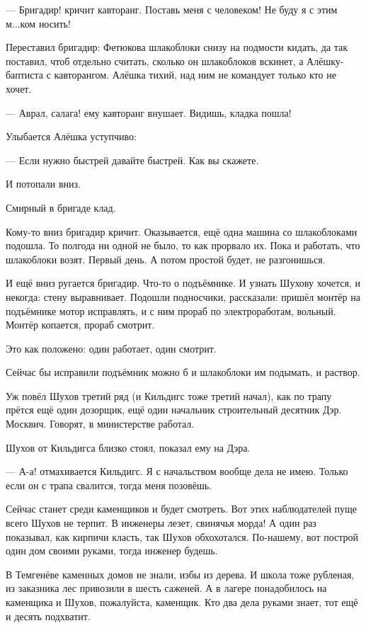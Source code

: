 --- Бригадир! \dash кричит кавторанг. \Dash Поставь меня с человеком! Не буду я с этим м...ком носить!

Переставил бригадир: Фетюкова шлакоблоки снизу на подмости кидать, да так поставил, чтоб
отдельно считать, сколько он шлакоблоков вскинет, а Алёшку-баптиста \dash с кавторангом. Алёшка
\dash тихий, над ним не командует только кто не хочет.

--- Аврал, салага! \dash ему кавторанг внушает. \Dash Видишь, кладка пошла!

Улыбается Алёшка уступчиво:

--- Если нужно быстрей \dash давайте быстрей. Как вы скажете.

И потопали вниз.

Смирный \dash в бригаде клад.

Кому-то вниз бригадир кричит. Оказывается, ещё одна машина со шлакоблоками подошла. То
полгода ни одной не было, то как прорвало их. Пока и работать, что шлакоблоки возят. Первый
день. А потом простой будет, не разгонишься.

И ещё вниз ругается бригадир. Что-то о подъёмнике. И узнать Шухову хочется, и некогда: стену
выравнивает. Подошли подносчики, рассказали: пришёл монтёр на подъёмнике мотор исправлять,
и с ним прораб по электроработам, вольный. Монтёр копается, прораб смотрит.

Это \dash как положено: один работает, один смотрит.

Сейчас бы исправили подъёмник \dash можно б и шлакоблоки им подымать, и раствор.

Уж повёл Шухов третий ряд (и Кильдигс тоже третий начал), как по трапу прётся ещё один
дозорщик, ещё один начальник \dash строительный десятник Дэр. Москвич. Говорят, в министерстве
работал.

Шухов от Кильдигса близко стоял, показал ему на Дэра.

--- А-а! \dash отмахивается Кильдигс. \Dash Я с начальством вообще дела не имею. Только если он с трапа
свалится, тогда меня позовёшь.

Сейчас станет среди каменщиков и будет смотреть. Вот этих наблюдателей пуще всего Шухов не
терпит. В инженеры лезет, свинячья морда! А один раз показывал, как кирпичи класть, так Шухов
обхохотался. По-нашему, вот построй один дом своими руками, тогда инженер будешь.

В Темгенёве каменных домов не знали, избы из дерева. И школа тоже рубленая, из заказника лес
привозили в шесть саженей. А в лагере понадобилось на каменщика \dash и Шухов, пожалуйста,
каменщик. Кто два дела руками знает, тот ещё и десять подхватит.

